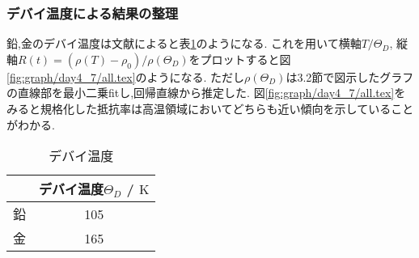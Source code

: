 \subsubsection{デバイ温度による結果の整理}
鉛,金のデバイ温度は文献\cite{kittel}によると表\ref{tab:ThetaD}のようになる.
これを用いて横軸$T/\Theta_D$, 縦軸$R(t)=(\rho(T)-\rho_0)/\rho(\Theta_D)$をプロットすると図\ref{fig:graph/day4_7/all.tex}のようになる.
ただし$\rho(\Theta_D)$は3.2節で図示したグラフの直線部を最小二乗fitし,回帰直線から推定した.
図\ref{fig:graph/day4_7/all.tex}をみると規格化した抵抗率は高温領域においてどちらも近い傾向を示していることがわかる.
\begin{table}[h]
\caption{デバイ温度}
\label{tab:ThetaD}
\centering
\begin{tabular}{c|c}
\hline
&デバイ温度$\Theta_D$ / $\si{\kelvin}$\\
\hline \hline
鉛&105\\
金&165\\
\hline
\end{tabular}
\end{table}
